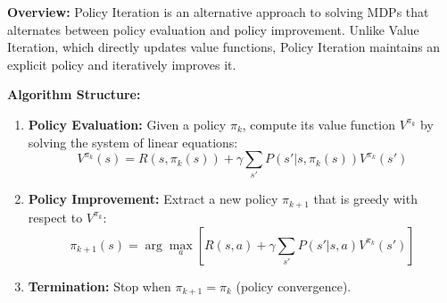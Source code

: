 \documentclass[12pt]{article}
\begin{document}
\textbf{Overview:} Policy Iteration is an alternative approach to solving MDPs that alternates between policy evaluation and policy improvement. Unlike Value Iteration, which directly updates value functions, Policy Iteration maintains an explicit policy and iteratively improves it.

\textbf{Algorithm Structure:}
\begin{enumerate}
    \item \textbf{Policy Evaluation:} Given a policy \( \pi_k \), compute its value function \( V^{\pi_k} \) by solving the system of linear equations:
    \begin{equation}
    V^{\pi_k}(s) = R(s, \pi_k(s)) + \gamma \sum_{s'} P(s'|s, \pi_k(s)) V^{\pi_k}(s')
    \end{equation}
    
    \item \textbf{Policy Improvement:} Extract a new policy \( \pi_{k+1} \) that is greedy with respect to \( V^{\pi_k} \):
    \begin{equation}
    \pi_{k+1}(s) = \arg\max_a \left[ R(s,a) + \gamma \sum_{s'} P(s'|s,a) V^{\pi_k}(s') \right]
    \end{equation}
    
    \item \textbf{Termination:} Stop when \( \pi_{k+1} = \pi_k \) (policy convergence).
\end{enumerate}
\end{document}
